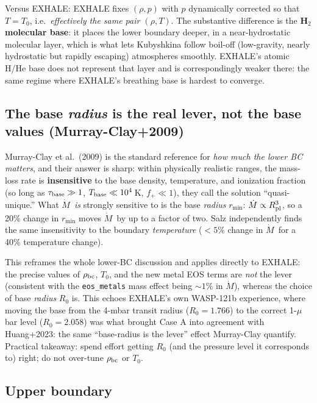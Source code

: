 \documentclass[english,a4paper]{my_memo}
\newcommand{\Mdot}{$\dot M$}
\begin{document}
Versus EXHALE: EXHALE fixes $(\rho,p)$ with $p$ dynamically corrected so
that $T=T_0$, i.e.\ \emph{effectively the same pair $(\rho,T)$}. The
substantive difference is the \textbf{H$_2$ molecular base}: it places
the lower boundary deeper, in a near-hydrostatic molecular layer, which
is what lets Kubyshkina follow boil-off (low-gravity, nearly hydrostatic
but rapidly escaping) atmospheres smoothly. EXHALE's atomic H/He base
does not represent that layer and is correspondingly weaker there:
the same regime where EXHALE's breathing base is hardest to converge.

\subsection{The base \emph{radius} is the real lever, not the base
values (Murray-Clay+2009)}
\label{sec:rmin}

Murray-Clay et al.\ (2009) is the standard reference for \emph{how
much the lower BC matters}, and their answer is sharp: within physically
realistic ranges, the mass-loss rate is \textbf{insensitive} to the base
density, temperature, and ionization fraction (so long as
$\tau_{\rm base}\gg1$, $T_{\rm base}\ll10^4$\,K, $f_+\ll1$), they call
the solution ``quasi-unique.'' What \Mdot\ \emph{is} strongly sensitive
to is the base \emph{radius} $r_{\min}$: $\dot M\propto R_{\rm pl}^3$, so
a 20\% change in $r_{\min}$ moves \Mdot\ by up to a factor of two. Salz
independently finds the same insensitivity to the boundary
\emph{temperature} ($<5\%$ change in \Mdot\ for a 40\% temperature
change).

This reframes the whole lower-BC discussion and applies directly to
EXHALE: the precise values of $\rho_{\rm bc}$, $T_0$, and the new metal
EOS terms are \emph{not} the lever (consistent with the
\texttt{eos\_metals} mass effect being ${\sim}1\%$ in \Mdot), whereas the
choice of base \emph{radius} $R_0$ is. This echoes EXHALE's own
WASP-121b experience, where moving the base from the 4-mbar transit
radius ($R_0=1.766$) to the correct 1-$\mu$bar level ($R_0=2.058$) was
what brought Case A into agreement with Huang+2023: the same
``base-radius is the lever'' effect Murray-Clay quantify. Practical
takeaway: spend effort getting $R_0$ (and the pressure level it
corresponds to) right; do not over-tune $\rho_{\rm bc}$ or $T_0$.

\subsection{Upper boundary}
\end{document}
